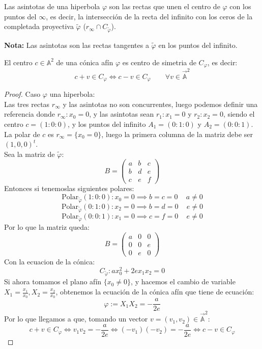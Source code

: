 \begin{definición}
    Las asintotas de una hiperbola $\varphi$ son las rectas que unen el centro de $\varphi$ con los puntos del $\infty$, es decir, la intersección de la recta del infinito con los ceros de la completada proyectiva $\widetilde{\varphi}$ ($r_\infty \cap C_{\widetilde{\varphi}}$).
\end{definición}

\textbf{Nota: } Las asintotas son las rectas tangentes a $\widetilde{\varphi}$ en los puntos del infinito.

\begin{proposición}
    El centro $c \in \mathbb{A}^2$ de una cónica afín $\varphi$ es centro de simetria de $C_{\varphi}$, es decir:
    \[
    c + v \in C_{\varphi} \iff c - v \in C_{\varphi} \qquad \forall v \in \vec{\mathbb{A}}^2
    \]
\end{proposición}

\begin{proof}
    Caso $\varphi$ una hiperbola:\\
    Las tres rectas $r_\infty$ y las asintotas no son concurrentes, luego podemos definir una referencia donde $r_\infty : x_0 = 0$, y las asintotas sean $r_1 : x_1 = 0$ y $r_2 : x_2 = 0$, siendo el centro $c = (1:0:0)$, y los puntos del infinito $A_1 = (0:1:0)$ y $A_2 = (0:0:1)$.\\
    La polar de $c$ es $r_\infty = \{ x_0 = 0 \}$, luego la primera columna de la matriz debe ser $(1,0,0)^t$.\\
    Sea la matriz de $\widetilde{\varphi}$:
    \[
    B =
    \begin{pmatrix}
        a & b & c \\
        b & d & e \\
        c & e & f
    \end{pmatrix}
    \]
    Entonces si tenemoslas siguientes polares:
    \[
    \text{Polar}_{\widetilde{\varphi}} (1 :0:0) : x_0 = 0 \implies
    b = c = 0 \, \quad a \neq 0
    \]
    \[
    \text{Polar}_{\widetilde{\varphi}} (0 :1:0) : x_2 = 0 \implies
    b = d = 0 \, \quad e \neq 0
    \]
    \[
    \text{Polar}_{\widetilde{\varphi}} (0 :0:1) : x_1 = 0 \implies
    c = f = 0 \, \quad e \neq 0
    \]
    Por lo que la matriz queda:
    \[
    B =
    \begin{pmatrix}
        a & 0 & 0 \\
        0 & 0 & e \\
        0 & e & 0
    \end{pmatrix}
    \]
    Con la ecuacion de la cónica:
    \[
    C_{\widetilde{\varphi}} : a x_0^2 + 2 e x_1 x_2 = 0
    \]
    Si ahora tomamos el plano afín $\{ x_0 \neq 0 \}$, y hacemos el cambio de variable $X_1 = \frac{x_1}{x_0}, X_2 = \frac{x_2}{x_0}$, obtenemos la ecuación de la cónica afín que tiene de ecuación:
    \[
    \varphi := X_1 X_2 = -\frac{a}{2e}
    \]
    Por lo que llegamos a que, tomando un vector $v = (v_1, v_2) \in \vec{\mathbb{A}}^2$:
    \[
    \boxed{ c + v \in C_{\varphi} }
    \iff 
    v_1v_2 = -\frac{a}{2e} \iff 
    (-v_1)(-v_2) = -\frac{a}{2e} \iff
    \boxed{ c - v \in C_{\varphi} }
    \]
\end{proof}

